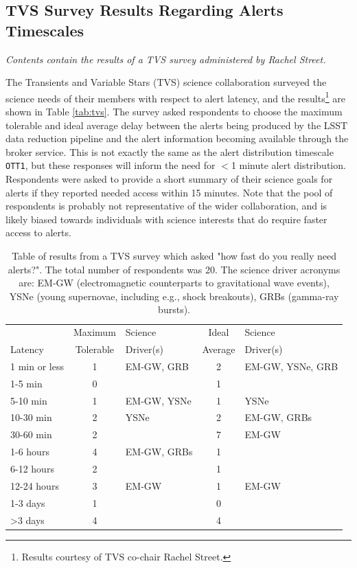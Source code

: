 \documentclass[DM,lsstdraft,authoryear,toc]{lsstdoc}
\begin{document}
\subsection{TVS Survey Results Regarding Alerts Timescales}\label{ssec:latency_tvs}
{\it Contents contain the results of a TVS survey administered by Rachel Street.}

The Transients and Variable Stars (TVS) science collaboration surveyed the science needs of their members with respect to alert latency, and the results\footnote{Results courtesy of TVS co-chair Rachel Street.} are shown in Table \ref{tab:tvs}.
The survey asked respondents to choose the maximum tolerable and ideal average delay between the alerts being produced by the LSST data reduction pipeline and the alert information becoming available through the broker service.
This is not exactly the same as the alert distribution timescale {\tt OTT1}, but these responses will inform the need for $<$1 minute alert distribution.
Respondents were asked to provide a short summary of their science goals for alerts if they reported needed access within 15 minutes.
Note that the pool of respondents is probably not representative of the wider collaboration, and is likely biased towards individuals with science interests that do require faster access to alerts. 

\begin{table}[h]%
\caption{Table of results from a TVS survey which asked "how fast do you really need alerts?". The total number of respondents was 20. The science driver acronyms are: EM-GW (electromagnetic counterparts to gravitational wave events), YSNe (young supernovae, including e.g., shock breakouts), GRBs (gamma-ray bursts). \label{tab:tvs}}
\begin{center}
\begin{tabular}{|l|cl|cl|}
\hline
             & Maximum & Science & Ideal       & Science \\
Latency & Tolerable  & Driver(s) &  Average & Driver(s) \\
\hline
1 min or less & 1 & EM-GW, GRB  & 2 & EM-GW, YSNe, GRB \\
1-5 min         & 0 &                          & 1 &                                   \\
5-10 min       & 1 & EM-GW, YSNe & 1 & YSNe \\
10-30 min     & 2 & YSNe               & 2 & EM-GW, GRBs \\
30-60 min     & 2 &                          & 7 & EM-GW  \\
1-6 hours     & 4 & EM-GW, GRBs & 1 &  \\
6-12 hours   & 2 &                          & 1 &  \\
12-24 hours & 3 & EM-GW            & 1 & EM-GW \\
1-3 days      & 1 &                           & 0 &  \\
>3 days       & 4 &                           & 4 &  \\
\hline
\end{tabular}
\end{center}
\label{default}
\end{table}%
\end{document}
